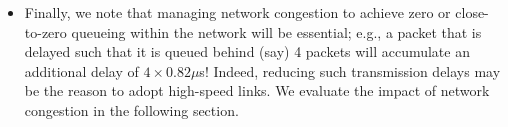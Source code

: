 \begin{itemize}[leftmargin=*]
	\item Finally, we note that managing network congestion to achieve zero or close-to-zero queueing within the network will be essential; e.g., a packet that is delayed such that it is queued behind (say) 4 packets will accumulate an additional delay of $4\times0.82\mu$s! 
	Indeed, reducing such transmission delays may be the reason to adopt high-speed links. We evaluate the impact of network congestion in the following section.

\end{itemize} 

